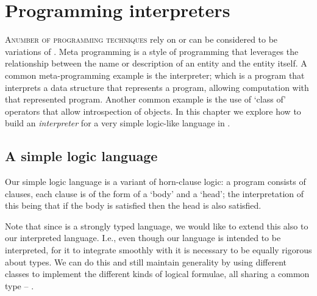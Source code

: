 \chapter{Programming interpreters}
\label{meta}

\lettrine[nindent=0.1em]{A}{number of programming techniques} rely on or can be considered to be variations of . Meta programming is a style of programming that leverages the relationship between the name or description of an entity and the entity itself. A common meta-programming example is the interpreter; which is a program that interprets a data structure that represents a program, allowing computation with that represented program. Another common example is the use of `class of' operators that allow introspection of objects. In this chapter we explore how to build an \emph{interpreter} for a very simple logic-like language in \go.

\section{A simple logic language}
Our simple logic language is a variant of horn-clause logic: a program consists of clauses, each clause is of the form of a `body' and a `head'; the interpretation of this being that if the body is satisfied then the head is also satisfied. 

Note that since \go is a strongly typed language, we would like to extend this also to our interpreted language. I.e., even though our language is intended to be interpreted, for it to integrate smoothly with \go it is necessary to be equally rigorous about types. We can do this and still maintain generality by using different classes to implement the different kinds of logical formulae, all sharing a common type -- .

